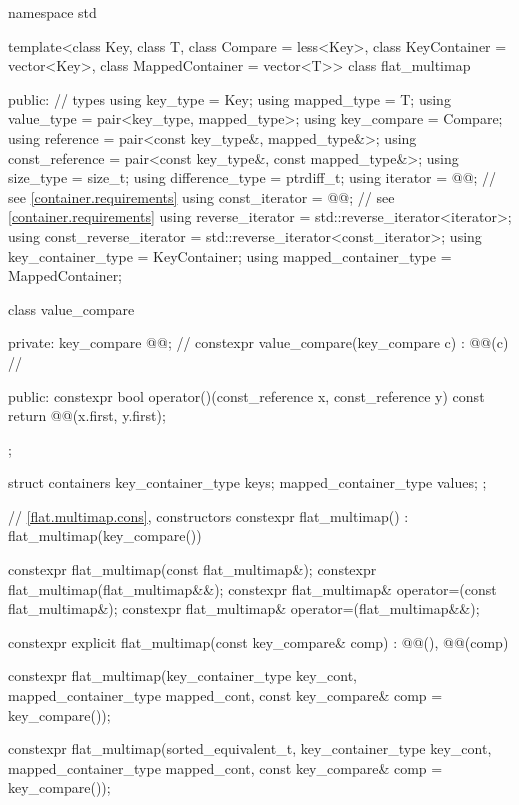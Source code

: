 \begin{codeblock}
namespace std {
  template<class Key, class T, class Compare = less<Key>,
           class KeyContainer = vector<Key>, class MappedContainer = vector<T>>
  class flat_multimap {
  public:
    // types
    using key_type               = Key;
    using mapped_type            = T;
    using value_type             = pair<key_type, mapped_type>;
    using key_compare            = Compare;
    using reference              = pair<const key_type&, mapped_type&>;
    using const_reference        = pair<const key_type&, const mapped_type&>;
    using size_type              = size_t;
    using difference_type        = ptrdiff_t;
    using iterator               = @@;     // see \ref{container.requirements}
    using const_iterator         = @@;     // see \ref{container.requirements}
    using reverse_iterator       = std::reverse_iterator<iterator>;
    using const_reverse_iterator = std::reverse_iterator<const_iterator>;
    using key_container_type     = KeyContainer;
    using mapped_container_type  = MappedContainer;

    class value_compare {
    private:
      key_compare @@;                                         // \expos
      constexpr value_compare(key_compare c) : @@(c) { }      // \expos

    public:
      constexpr bool operator()(const_reference x, const_reference y) const {
        return @@(x.first, y.first);
      }
    };

    struct containers {
      key_container_type keys;
      mapped_container_type values;
    };

    // \ref{flat.multimap.cons}, constructors
    constexpr flat_multimap() : flat_multimap(key_compare()) { }

    constexpr flat_multimap(const flat_multimap&);
    constexpr flat_multimap(flat_multimap&&);
    constexpr flat_multimap& operator=(const flat_multimap&);
    constexpr flat_multimap& operator=(flat_multimap&&);

    constexpr explicit flat_multimap(const key_compare& comp)
      : @@(), @@(comp) { }

    constexpr flat_multimap(key_container_type key_cont, mapped_container_type mapped_cont,
                            const key_compare& comp = key_compare());

    constexpr flat_multimap(sorted_equivalent_t,
                            key_container_type key_cont, mapped_container_type mapped_cont,
                  const key_compare& comp = key_compare());

}}
\end{codeblock}

